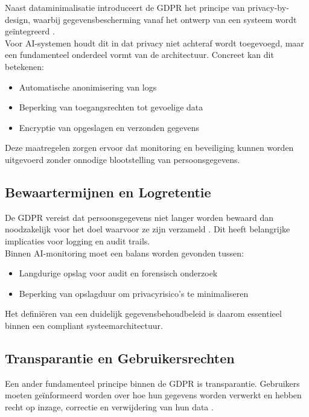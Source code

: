 Naast dataminimalisatie introduceert de GDPR het principe van privacy-by-design, waarbij gegevensbescherming vanaf het ontwerp van een systeem wordt geïntegreerd \autocite{edpb2021}.\\

Voor AI-systemen houdt dit in dat privacy niet achteraf wordt toegevoegd, maar een fundamenteel onderdeel vormt van de architectuur. Concreet kan dit betekenen:

\begin{itemize}
    \item Automatische anonimisering van logs
    \item Beperking van toegangsrechten tot gevoelige data
    \item Encryptie van opgeslagen en verzonden gegevens
\end{itemize}

Deze maatregelen zorgen ervoor dat monitoring en beveiliging kunnen worden uitgevoerd zonder onnodige blootstelling van persoonsgegevens.

\subsection{Bewaartermijnen en Logretentie}

De GDPR vereist dat persoonsgegevens niet langer worden bewaard dan noodzakelijk voor het doel waarvoor ze zijn verzameld \autocite{gdpr2016}. Dit heeft belangrijke implicaties voor logging en audit trails.\\

Binnen AI-monitoring moet een balans worden gevonden tussen:

\begin{itemize}
    \item Langdurige opslag voor audit en forensisch onderzoek
    \item Beperking van opslagduur om privacyrisico’s te minimaliseren
\end{itemize}

Het definiëren van een duidelijk gegevensbehoudbeleid is daarom essentieel binnen een compliant systeemarchitectuur.

\subsection{Transparantie en Gebruikersrechten}

Een ander fundamenteel principe binnen de GDPR is transparantie. Gebruikers moeten geïnformeerd worden over hoe hun gegevens worden verwerkt en hebben recht op inzage, correctie en verwijdering van hun data \autocite{gdpr2016}.\\

